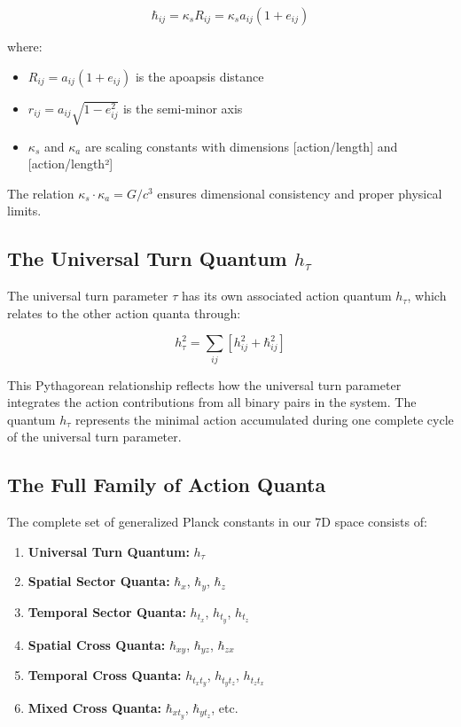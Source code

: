 \documentclass{article}
\begin{document}
\begin{equation}
\hbar_{ij} = \kappa_s R_{ij} = \kappa_s a_{ij}(1+e_{ij})
\end{equation}

where:
\begin{itemize}
\item $R_{ij} = a_{ij}(1+e_{ij})$ is the apoapsis distance
\item $r_{ij} = a_{ij}\sqrt{1-e_{ij}^2}$ is the semi-minor axis
\item $\kappa_s$ and $\kappa_a$ are scaling constants with dimensions [action/length] and [action/length²]
\end{itemize}

The relation $\kappa_s \cdot \kappa_a = G/c^3$ ensures dimensional consistency and proper physical limits.

\subsection{The Universal Turn Quantum $h_\tau$}

The universal turn parameter $\tau$ has its own associated action quantum $h_\tau$, which relates to the other action quanta through:

\begin{equation}
h_\tau^2 = \sum_{ij} \left[ h_{ij}^2 + \hbar_{ij}^2 \right]
\end{equation}

This Pythagorean relationship reflects how the universal turn parameter integrates the action contributions from all binary pairs in the system. The quantum $h_\tau$ represents the minimal action accumulated during one complete cycle of the universal turn parameter.

\subsection{The Full Family of Action Quanta}

The complete set of generalized Planck constants in our 7D space consists of:

\begin{enumerate}
\item \textbf{Universal Turn Quantum:} $h_\tau$
\item \textbf{Spatial Sector Quanta:} $\hbar_x$, $\hbar_y$, $\hbar_z$
\item \textbf{Temporal Sector Quanta:} $h_{t_x}$, $h_{t_y}$, $h_{t_z}$
\item \textbf{Spatial Cross Quanta:} $\hbar_{xy}$, $\hbar_{yz}$, $\hbar_{zx}$
\item \textbf{Temporal Cross Quanta:} $h_{t_x t_y}$, $h_{t_y t_z}$, $h_{t_z t_x}$
\item \textbf{Mixed Cross Quanta:} $\hbar_{x t_y}$, $\hbar_{y t_z}$, etc.
\end{enumerate}
\end{document}
